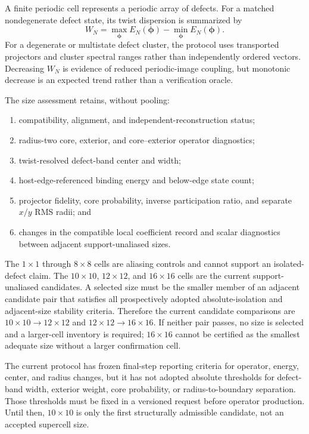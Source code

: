 \documentclass[11pt]{article}
\begin{document}
A finite periodic cell represents a periodic array of defects.  For a matched
nondegenerate defect state, its twist dispersion is summarized by
\begin{equation}
  W_N = \max_{\boldsymbol\phi} E_N(\boldsymbol\phi)
      - \min_{\boldsymbol\phi} E_N(\boldsymbol\phi).
\end{equation}
For a degenerate or multistate defect cluster, the protocol uses transported projectors
and cluster spectral ranges rather than independently ordered vectors.  Decreasing
$W_N$ is evidence of reduced periodic-image coupling, but monotonic decrease is an
expected trend rather than a verification oracle.

The size assessment retains, without pooling:
\begin{enumerate}[leftmargin=*]
  \item compatibility, alignment, and independent-reconstruction status;
  \item radius-two core, exterior, and core--exterior operator diagnostics;
  \item twist-resolved defect-band center and width;
  \item host-edge-referenced binding energy and below-edge state count;
  \item projector fidelity, core probability, inverse participation ratio, and separate
    $x/y$ RMS radii; and
  \item changes in the compatible local coefficient record and scalar diagnostics
    between adjacent support-unaliased sizes.
\end{enumerate}

The $1\times1$ through $8\times8$ cells are aliasing controls and cannot support an
isolated-defect claim.  The $10\times10$, $12\times12$, and $16\times16$ cells are the
current support-unaliased candidates.  A selected size must be the smaller member of an
adjacent candidate pair that satisfies all prospectively adopted absolute-isolation and
adjacent-size stability criteria.  Therefore the current candidate comparisons are
$10\times10\rightarrow12\times12$ and
$12\times12\rightarrow16\times16$.  If neither pair passes, no size is selected and a
larger-cell inventory is required; $16\times16$ cannot be certified as the smallest
adequate size without a larger confirmation cell.

The current protocol has frozen final-step reporting criteria for operator, energy,
center, and radius changes, but it has not adopted absolute thresholds for defect-band
width, exterior weight, core probability, or radius-to-boundary separation.  Those
thresholds must be fixed in a versioned request before operator production.  Until then,
$10\times10$ is only the first structurally admissible candidate, not an accepted
supercell size.
\end{document}
